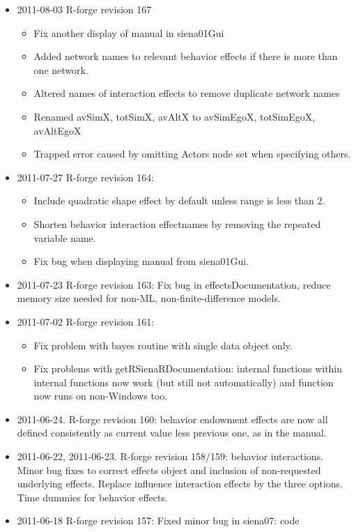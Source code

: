 \documentclass[a4paper,fleqn,11pt]{article}
\newcommand{\+}{\, + \,}
\begin{document}
{\begin{small}
\begin{itemize}
\begin{itemize}
\end{itemize}
\item 2011-08-03 R-forge revision 167
\begin{itemize}
\item Fix another display of manual in siena01Gui
\item Added network names to relevant behavior effects if there is more than one
  network.
\item Altered names of interaction effects to remove duplicate network names
\item Renamed avSimX, totSimX, avAltX to avSimEgoX, totSimEgoX, avAltEgoX
\item Trapped error caused by omitting Actors node set when specifying others.
\end{itemize}
\item 2011-07-27 R-forge revision 164:
\begin{itemize}
\item
Include quadratic shape effect by default unless range is less than 2.
\item
Shorten behavior interaction effectnames by removing the repeated variable name.
\item Fix bug when displaying manual from siena01Gui.
\end{itemize}
\item 2011-07-23 R-forge revision 163:
Fix bug in effectsDocumentation, reduce memory size needed for non-ML,
non-finite-difference models.
\item 2011-07-02 R-forge revision 161:
\begin{itemize}
\item Fix problem with bayes routine with single data object only.
\item Fix problems with getRSienaRDocumentation: internal functions within
internal functions  now work (but still not automatically)
and function now runs on non-Windows too.
\end{itemize}
\item 2011-06-24. R-forge revision 160: behavior endowment effects are now
  all defined consistently as current value less previous one, as in the manual.
\item 2011-06-22, 2011-06-23. R-forge revision 158/159: behavior
  interactions. Minor bug fixes to correct effects object and inclusion of
  non-requested underlying effects. Replace influence interaction effects by the
  three options. Time dummies for behavior effects.
\item 2011-06-18 R-forge revision 157: Fixed minor bug in siena07: code

\end{itemize}
\end{small}}
\end{document}
